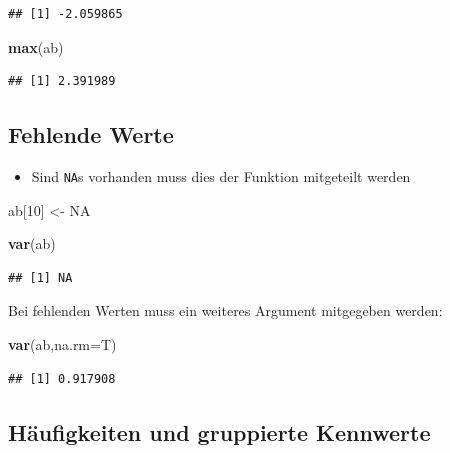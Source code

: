\documentclass[]{article}
\newenvironment{Shaded}{\begin{snugshade}}{\end{snugshade}}
\newcommand{\KeywordTok}[1]{\textcolor[rgb]{0.13,0.29,0.53}{\textbf{{#1}}}}
\newcommand{\DataTypeTok}[1]{\textcolor[rgb]{0.13,0.29,0.53}{{#1}}}
\newcommand{\DecValTok}[1]{\textcolor[rgb]{0.00,0.00,0.81}{{#1}}}
\newcommand{\StringTok}[1]{\textcolor[rgb]{0.31,0.60,0.02}{{#1}}}
\newcommand{\OtherTok}[1]{\textcolor[rgb]{0.56,0.35,0.01}{{#1}}}
\newcommand{\NormalTok}[1]{{#1}}
\providecommand{\tightlist}{%
  \setlength{\itemsep}{0pt}\setlength{\parskip}{0pt}}
\begin{document}
\begin{verbatim}
## [1] -2.059865
\end{verbatim}

\begin{Shaded}
\begin{Highlighting}[]
\KeywordTok{max}\NormalTok{(ab)}
\end{Highlighting}
\end{Shaded}

\begin{verbatim}
## [1] 2.391989
\end{verbatim}

\subsection{Fehlende Werte}\label{fehlende-werte}

\begin{itemize}
\tightlist
\item
  Sind \texttt{NA}s vorhanden muss dies der Funktion mitgeteilt werden
\end{itemize}

\begin{Shaded}
\begin{Highlighting}[]
\NormalTok{ab[}\DecValTok{10}\NormalTok{] <-}\StringTok{ }\OtherTok{NA}

\KeywordTok{var}\NormalTok{(ab)}
\end{Highlighting}
\end{Shaded}

\begin{verbatim}
## [1] NA
\end{verbatim}

Bei fehlenden Werten muss ein weiteres Argument mitgegeben werden:

\begin{Shaded}
\begin{Highlighting}[]
\KeywordTok{var}\NormalTok{(ab,}\DataTypeTok{na.rm=}\NormalTok{T)}
\end{Highlighting}
\end{Shaded}

\begin{verbatim}
## [1] 0.917908
\end{verbatim}

\subsection{Häufigkeiten und gruppierte
Kennwerte}\label{haufigkeiten-und-gruppierte-kennwerte}
\end{document}
